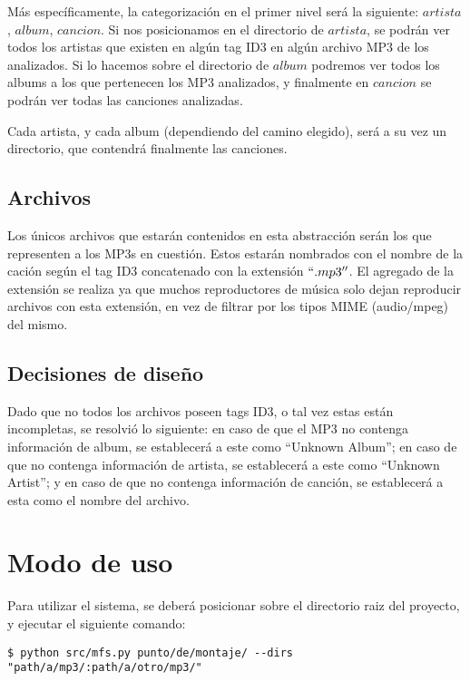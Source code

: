 \documentclass[a4paper,oneside]{report}
\begin{document}
Más específicamente, la categorización en el primer nivel será la siguiente: $artista$, $album$, $cancion$. Si nos posicionamos en el directorio de $artista$, se podrán ver todos los artistas que existen en algún tag ID3 en algún archivo MP3 de los analizados. Si lo hacemos sobre el directorio de $album$ podremos ver todos los albums a los que pertenecen los MP3 analizados, y finalmente en $cancion$ se podrán ver todas las canciones analizadas.

Cada artista, y cada album (dependiendo del camino elegido), será a su vez un directorio, que contendrá finalmente las canciones.

\section{Archivos}

Los únicos archivos que estarán contenidos en esta abstracción serán los que representen a los MP3s en cuestión. Estos estarán nombrados con el nombre de la cación según el tag ID3 concatenado con la extensión $``.mp3''$. El agregado de la extensión se realiza ya que muchos reproductores de música solo dejan reproducir archivos con esta extensión, en vez de filtrar por los tipos MIME (audio/mpeg) del mismo.

\section{Decisiones de diseño}

Dado que no todos los archivos poseen tags ID3, o tal vez estas están incompletas, se resolvió lo siguiente: en caso de que el MP3 no contenga información de album, se establecerá a este como ``Unknown Album''; en caso de que no contenga información de artista, se establecerá a este como ``Unknown Artist''; y en caso de que no contenga información de canción, se establecerá	 a esta como el nombre del archivo.

\chapter{Modo de uso}

Para utilizar el sistema, se deberá posicionar sobre el directorio raiz del proyecto, y ejecutar el siguiente comando:

\begin{lstlisting}
$ python src/mfs.py punto/de/montaje/ --dirs "path/a/mp3/:path/a/otro/mp3/"
\end{lstlisting}
\end{document}
